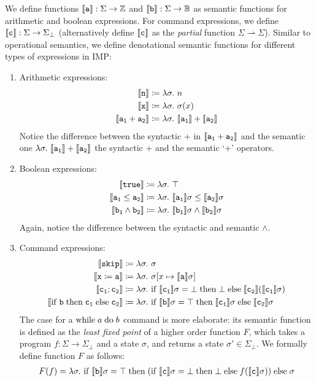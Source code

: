 \begin{definition}
We define functions 
$\sde{a}: \Sigma \to \ZN$ and 
$\sde{b}: \Sigma \to \BN$ 
as semantic functions for arithmetic and boolean expressions.
For command expressions, we define 
$\sde{c}: \Sigma \to \Sigma_\bot$ 
(alternatively define $\sde{c}$ as the \emph{partial} function $\Sigma \rightharpoonup \Sigma$).
Similar to operational semantics, 
we define denotational semantic functions 
for different types of expressions in IMP:
\begin{enumerate}
    \item Arithmetic expressions:
    \begin{align*}
        \sde{n} &\coloneqq \defun{n}\\
        \sde{x} &\coloneqq \defun{\sigma(x)}  \\
        \sde{a_1 + a_2} &\coloneqq
          \defun{\sde{a_1} + \sde{a_2}}
    \end{align*}
    Notice the difference between the syntactic $+$ in $  \sde{a_1 + a_2}$ and the semantic one  $\defun{\sde{a_1} + \sde{a_2}}$
    the syntactic + and the semantic `+' operators.
    \item Boolean expressions:
    \begin{align*}
        \sde{true}  &\coloneqq \defun{\top} \\
        \sde{a_1 \leq a_2}  &\coloneqq 
          \defun{\sde{a_1} \sigma \leq \sde{a_2} \sigma}  \\ 
        \sde{b_1 \land b_2}  &\coloneqq 
          \defun{\sde{b_1} \sigma \land \sde{b_2} \sigma}
    \end{align*}
    Again, notice the difference between the syntactic and semantic $\land$.
    \item Command expressions:
    \begin{align*}
        \sde{\sskip}  &\coloneqq \defun{\sigma} \\
        \sde{x \coloneqq    a}  &\coloneqq
          \defun{\sigma[x \mapsto \sde{a} \sigma]} \\
        \sde{c_1; c_2}  &\coloneqq 
          \defun{\sif{\sde{c_1} \sigma = \bot}{\bot}{\sde{c_2}(\sde{c_1} \sigma)}} \\
        \sde{ \sif{b}{c_1}{c_2}} &\coloneqq 
          \defun{ \sif{\sde{b} \sigma = \top}{\sde{c_1} \sigma}{\sde{c_2} \sigma}}
    \end{align*}
    The case for a $\swhile{a}{b}$ command is more elaborate:
    its semantic function is defined as 
    the \emph{least fixed point} of a higher order function $F$,
    which takes a program $f: \Sigma \to \Sigma_\bot$
    and a state $\sigma$, and returns a state $\sigma' \in \Sigma_\bot$.
    We formally define function $F$ as follows: 
    \begin{align*}
         F(f) = 
      \defun{\sif{\sde{b} \sigma = \top}{(\sif{\sde{c} \sigma = \bot}{\bot}{f(\sde{c} \sigma)})}{\sigma}}
    \end{align*}
\end{enumerate}
\end{definition}


